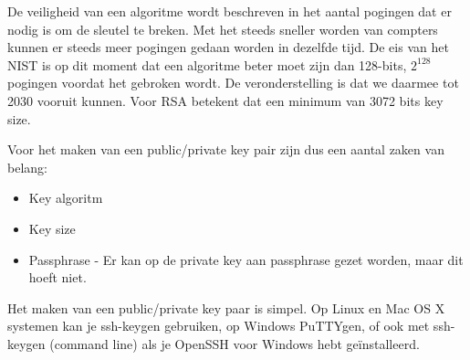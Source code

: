 De veiligheid van een algoritme wordt beschreven in het aantal pogingen dat er nodig is om de sleutel te breken. Met het steeds sneller worden van compters kunnen er steeds meer pogingen gedaan worden in dezelfde tijd. De eis van het NIST is op dit moment dat een algoritme beter moet zijn dan 128-bits, $2^128$ pogingen voordat het gebroken wordt. De veronderstelling is dat we daarmee tot 2030 vooruit kunnen. Voor RSA betekent dat een minimum van 3072 bits key size.

Voor het maken van een public/private key pair zijn dus een aantal zaken van belang:
\begin{itemize}
	\item Key algoritm
	\item Key size
	\item Passphrase - Er kan op de private key aan passphrase gezet worden, maar dit hoeft niet.
\end{itemize}

Het maken van een public/private key paar is simpel. Op Linux en Mac OS X systemen kan je ssh-keygen gebruiken, op Windows PuTTYgen, of ook met ssh-keygen (command line) als je OpenSSH voor Windows hebt ge\"installeerd.
